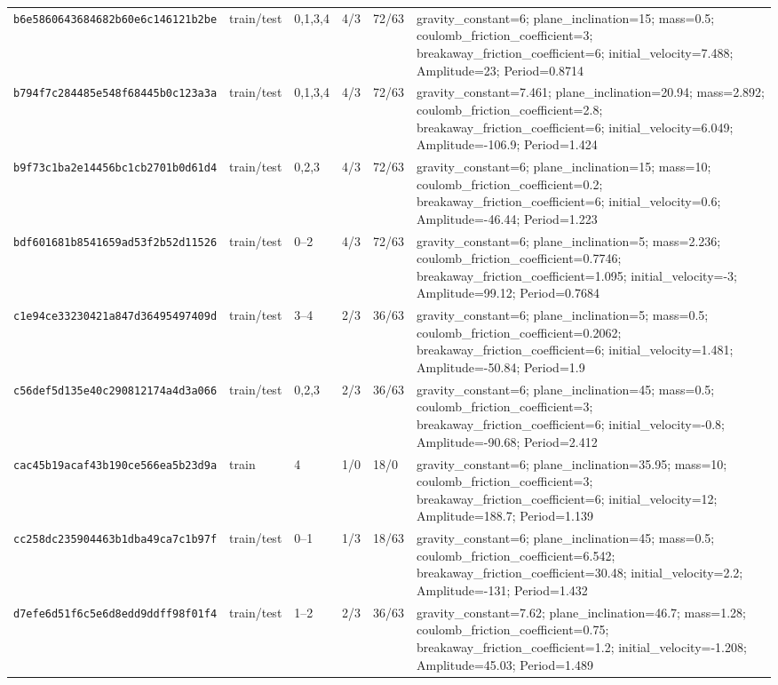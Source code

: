 \begin{tabular*}{\textwidth}{@{\extracolsep{\fill}}llllll@{}}
\texttt{b6e5860643684682b60e6c146121b2be} & train/test & 0,1,3,4 & 4/3 & 72/63 & gravity\_constant=6; plane\_inclination=15; mass=0.5; coulomb\_friction\_coefficient=3; breakaway\_friction\_coefficient=6; initial\_velocity=7.488; Amplitude=23; Period=0.8714 \\
\texttt{b794f7c284485e548f68445b0c123a3a} & train/test & 0,1,3,4 & 4/3 & 72/63 & gravity\_constant=7.461; plane\_inclination=20.94; mass=2.892; coulomb\_friction\_coefficient=2.8; breakaway\_friction\_coefficient=6; initial\_velocity=6.049; Amplitude=-106.9; Period=1.424 \\
\texttt{b9f73c1ba2e14456bc1cb2701b0d61d4} & train/test & 0,2,3 & 4/3 & 72/63 & gravity\_constant=6; plane\_inclination=15; mass=10; coulomb\_friction\_coefficient=0.2; breakaway\_friction\_coefficient=6; initial\_velocity=0.6; Amplitude=-46.44; Period=1.223 \\
\texttt{bdf601681b8541659ad53f2b52d11526} & train/test & 0--2 & 4/3 & 72/63 & gravity\_constant=6; plane\_inclination=5; mass=2.236; coulomb\_friction\_coefficient=0.7746; breakaway\_friction\_coefficient=1.095; initial\_velocity=-3; Amplitude=99.12; Period=0.7684 \\
\texttt{c1e94ce33230421a847d36495497409d} & train/test & 3--4 & 2/3 & 36/63 & gravity\_constant=6; plane\_inclination=5; mass=0.5; coulomb\_friction\_coefficient=0.2062; breakaway\_friction\_coefficient=6; initial\_velocity=1.481; Amplitude=-50.84; Period=1.9 \\
\texttt{c56def5d135e40c290812174a4d3a066} & train/test & 0,2,3 & 2/3 & 36/63 & gravity\_constant=6; plane\_inclination=45; mass=0.5; coulomb\_friction\_coefficient=3; breakaway\_friction\_coefficient=6; initial\_velocity=-0.8; Amplitude=-90.68; Period=2.412 \\
\texttt{cac45b19acaf43b190ce566ea5b23d9a} & train & 4 & 1/0 & 18/0 & gravity\_constant=6; plane\_inclination=35.95; mass=10; coulomb\_friction\_coefficient=3; breakaway\_friction\_coefficient=6; initial\_velocity=12; Amplitude=188.7; Period=1.139 \\
\texttt{cc258dc235904463b1dba49ca7c1b97f} & train/test & 0--1 & 1/3 & 18/63 & gravity\_constant=6; plane\_inclination=45; mass=0.5; coulomb\_friction\_coefficient=6.542; breakaway\_friction\_coefficient=30.48; initial\_velocity=2.2; Amplitude=-131; Period=1.432 \\
\texttt{d7efe6d51f6c5e6d8edd9ddff98f01f4} & train/test & 1--2 & 2/3 & 36/63 & gravity\_constant=7.62; plane\_inclination=46.7; mass=1.28; coulomb\_friction\_coefficient=0.75; breakaway\_friction\_coefficient=1.2; initial\_velocity=-1.208; Amplitude=45.03; Period=1.489 \\

\end{tabular*}

